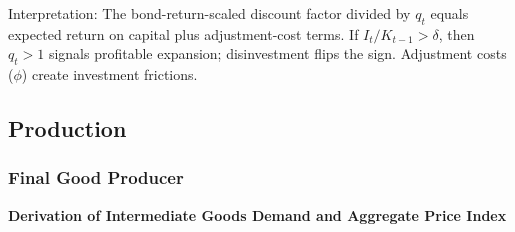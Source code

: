 \documentclass[11pt,preprint]{elsarticle}
\numberwithin{equation}{section}
\numberwithin{figure}{section}
\numberwithin{table}{section}
\begin{document}
Interpretation: The bond-return-scaled discount factor divided by
\(q_t\) equals expected return on capital plus adjustment-cost terms. If
\(I_t/K_{t-1}>\delta\), then \(q_t>1\) signals profitable expansion;
disinvestment flips the sign. Adjustment costs (\(\phi\)) create
investment frictions.

\subsection{Production}\label{production-1}

\subsubsection{\texorpdfstring{Final Good Producer
\label{final_good_producer_appendix}}{Final Good Producer }}\label{final-good-producer}

\textbf{Derivation of Intermediate Goods Demand and Aggregate Price
Index}
\end{document}
